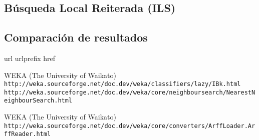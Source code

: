 \documentclass[a4paper, 11pt]{article}
\begin{document}
		\subsection{Búsqueda Local Reiterada (\textbf{ILS})}
			
			
			
			
		\subsection{Comparación de resultados}
			
			
	
	\newpage
	
	\begin{thebibliography}{10}
	\expandafter\ifx\csname url\endcsname\relax
	  \def\url#1{\texttt{#1}}\fi
	\expandafter\ifx\csname urlprefix\endcsname\relax\def\urlprefix{URL }\fi
	\expandafter\ifx\csname href\endcsname\relax
	  \def\href#1#2{#2} \def\path#1{#1}\fi
	
	WEKA (The University of Waikato)\\
	  \url{http://weka.sourceforge.net/doc.dev/weka/classifiers/lazy/IBk.html}\\
	  \url{http://weka.sourceforge.net/doc.dev/weka/core/neighboursearch/NearestNeighbourSearch.html}
	  
  	WEKA (The University of Waikato)\\
	  \url{http://weka.sourceforge.net/doc.dev/weka/core/converters/ArffLoader.ArffReader.html}
	  
	\end{thebibliography}
\end{document}
